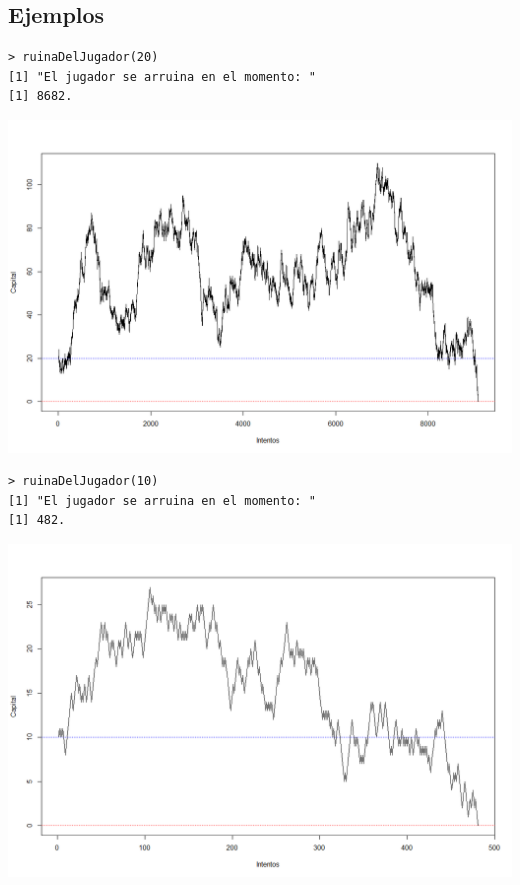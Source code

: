 \documentclass[10pt,a4paper]{article}
\begin{document}


\subsection{Ejemplos}

\begin{verbatim}
> ruinaDelJugador(20)
[1] "El jugador se arruina en el momento: "
[1] 8682.
\end{verbatim}
\begin{center}
\includegraphics[scale=0.35]{Jugador20_1.png} 
\end{center}


\begin{verbatim}
> ruinaDelJugador(10)
[1] "El jugador se arruina en el momento: "
[1] 482.
\end{verbatim}
\begin{center}
\includegraphics[scale=0.35]{Jugador10_1.png} 
\end{center}
\end{document}
